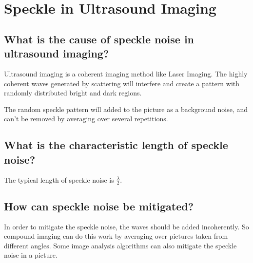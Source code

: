 \documentclass[11pt,a4paper,BCOR12mm, headexclude, footexclude, twoside, openright]{scrartcl}
\numberwithin{equation}{section} %
\numberwithin{figure}{section} %
\numberwithin{table}{section} %
\begin{document}
\section{Speckle in Ultrasound Imaging}

\subsection{What is the cause of speckle noise in ultrasound imaging?}

Ultrasound imaging is a coherent imaging method like Laser Imaging. The highly coherent waves generated by scattering will interfere and create a pattern with randomly distributed bright and dark regions. 

The random speckle pattern will added to the picture as a background noise, and can't be removed by averaging over several repetitions. 

\subsection{What is the characteristic length of speckle noise?}

The typical length of speckle noise is $\frac{\lambda}{2}$.

\subsection{How can speckle noise be mitigated?}

In order to mitigate the speckle noise, the waves should be added incoherently. So compound imaging can do this work by averaging over pictures taken from different angles. Some image analysis algorithms can also mitigate the speckle noise in a picture.
\end{document}
